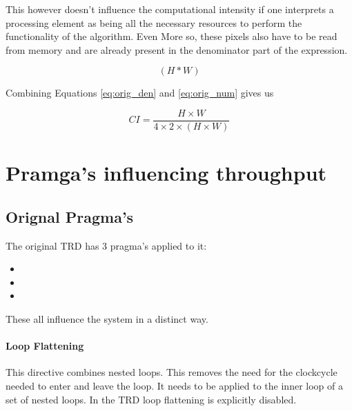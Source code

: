 This however doesn't influence the computational intensity if one interprets a processing element as being all the necessary resources to perform the functionality of the algorithm. Even More so, these pixels also have to be read from memory and are already present in the denominator part of the expression.


\begin{equation} \label{eq:orig_num}
( H * W )
\end{equation}

\medskip
Combining Equations \ref{eq:orig_den} and \ref{eq:orig_num} gives us
\medskip

\begin{equation}
CI = \frac{H \times W}{4 \times 2 \times ( H \times W )}
\end{equation}




\section{Pramga's influencing throughput}

\subsection{Orignal Pragma's}
\label{sec:original_pragma}

The original TRD has 3 pragma's applied to it:

\begin{itemize}
\item {}
\item {}
\item {}
\end{itemize}



These all influence the system in a distinct way.

\paragraph{Loop Flattening} This directive combines nested loops. This removes the need for the clockcycle needed to enter and leave the loop. It needs to be applied to the inner loop of a set of nested loops. In the TRD loop flattening is explicitly disabled.

